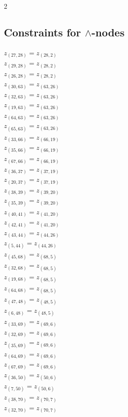 \documentclass{article}
\begin{document}
\begin{multicols*}{2}
\subsection{Constraints for $\wedge$-nodes}
$z_{(27, 28)} = z_{(28, 2)}$\\ 
$z_{(29, 28)} = z_{(28, 2)}$\\ 
$z_{(26, 28)} = z_{(28, 2)}$\\ 
$z_{(30, 63)} = z_{(63, 26)}$\\ 
$z_{(32, 63)} = z_{(63, 26)}$\\ 
$z_{(19, 63)} = z_{(63, 26)}$\\ 
$z_{(64, 63)} = z_{(63, 26)}$\\ 
$z_{(65, 63)} = z_{(63, 26)}$\\ 
$z_{(33, 66)} = z_{(66, 19)}$\\ 
$z_{(35, 66)} = z_{(66, 19)}$\\ 
$z_{(67, 66)} = z_{(66, 19)}$\\ 
$z_{(36, 37)} = z_{(37, 19)}$\\ 
$z_{(20, 37)} = z_{(37, 19)}$\\ 
$z_{(38, 39)} = z_{(39, 20)}$\\ 
$z_{(35, 39)} = z_{(39, 20)}$\\ 
$z_{(40, 41)} = z_{(41, 20)}$\\ 
$z_{(42, 41)} = z_{(41, 20)}$\\ 
$z_{(43, 44)} = z_{(44, 26)}$\\ 
$z_{(5, 44)} = z_{(44, 26)}$\\ 
$z_{(45, 68)} = z_{(68, 5)}$\\ 
$z_{(32, 68)} = z_{(68, 5)}$\\ 
$z_{(19, 68)} = z_{(68, 5)}$\\ 
$z_{(64, 68)} = z_{(68, 5)}$\\ 
$z_{(47, 48)} = z_{(48, 5)}$\\ 
$z_{(6, 48)} = z_{(48, 5)}$\\ 
$z_{(33, 69)} = z_{(69, 6)}$\\ 
$z_{(32, 69)} = z_{(69, 6)}$\\ 
$z_{(35, 69)} = z_{(69, 6)}$\\ 
$z_{(64, 69)} = z_{(69, 6)}$\\ 
$z_{(67, 69)} = z_{(69, 6)}$\\ 
$z_{(36, 50)} = z_{(50, 6)}$\\ 
$z_{(7, 50)} = z_{(50, 6)}$\\ 
$z_{(38, 70)} = z_{(70, 7)}$\\ 
$z_{(32, 70)} = z_{(70, 7)}$\\ 

\end{multicols*}
\end{document}
